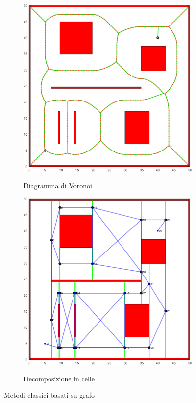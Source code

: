 \documentclass[14pt,a4paper]{extarticle}
\begin{document}
\begin{figure}[h]
\begin{subfigure}[t]{0.5\textwidth}
\centering
\caption{Diagramma di Voronoi}
\includegraphics[width=\textwidth]{voronoi.png}
\label{voronoi}
\end{subfigure}
\hfill
\begin{subfigure}[t]{0.5\textwidth}
\centering
\caption{Decomposizione in celle}
\includegraphics[width=\textwidth]{celldecomp.png}
\label{celldecomp}
\end{subfigure}
\caption{Metodi classici basati su grafo}
\end{figure}
\end{document}
